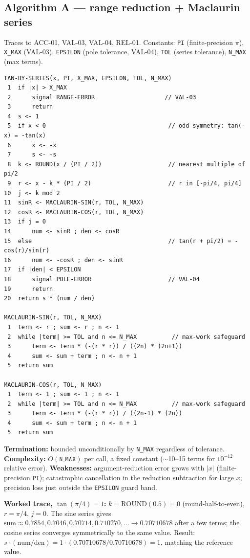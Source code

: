 \documentclass[11pt]{article}
\begin{document}
\subsection{Algorithm A --- range reduction + Maclaurin series}

Traces to ACC-01, VAL-03, VAL-04, REL-01. Constants: \texttt{PI} (finite-precision $\pi$), \texttt{X\_MAX} (VAL-03), \texttt{EPSILON} (pole tolerance, VAL-04), \texttt{TOL} (series tolerance), \texttt{N\_MAX} (max terms).

\begin{lstlisting}[style=pseudo,caption={Algorithm A: TAN-BY-SERIES},label={lst:algoA}]
TAN-BY-SERIES(x, PI, X_MAX, EPSILON, TOL, N_MAX)
 1  if |x| > X_MAX
 2      signal RANGE-ERROR                    // VAL-03
 3      return
 4  s <- 1
 5  if x < 0                                   // odd symmetry: tan(-x) = -tan(x)
 6      x <- -x
 7      s <- -s
 8  k <- ROUND(x / (PI / 2))                   // nearest multiple of pi/2
 9  r <- x - k * (PI / 2)                      // r in [-pi/4, pi/4]
10  j <- k mod 2
11  sinR <- MACLAURIN-SIN(r, TOL, N_MAX)
12  cosR <- MACLAURIN-COS(r, TOL, N_MAX)
13  if j = 0
14      num <- sinR ; den <- cosR
15  else                                       // tan(r + pi/2) = -cos(r)/sin(r)
16      num <- -cosR ; den <- sinR
17  if |den| < EPSILON
18      signal POLE-ERROR                      // VAL-04
19      return
20  return s * (num / den)

MACLAURIN-SIN(r, TOL, N_MAX)
 1  term <- r ; sum <- r ; n <- 1
 2  while |term| >= TOL and n <= N_MAX          // max-work safeguard
 3      term <- term * (-(r * r)) / ((2n) * (2n+1))
 4      sum <- sum + term ; n <- n + 1
 5  return sum

MACLAURIN-COS(r, TOL, N_MAX)
 1  term <- 1 ; sum <- 1 ; n <- 1
 2  while |term| >= TOL and n <= N_MAX          // max-work safeguard
 3      term <- term * (-(r * r)) / ((2n-1) * (2n))
 4      sum <- sum + term ; n <- n + 1
 5  return sum
\end{lstlisting}

\textbf{Termination:} bounded unconditionally by \texttt{N\_MAX} regardless of tolerance. \textbf{Complexity:} $O(\texttt{N\_MAX})$ per call, a fixed constant ($\sim$10--15 terms for $10^{-12}$ relative error). \textbf{Weaknesses:} argument-reduction error grows with $|x|$ (finite-precision \texttt{PI}); catastrophic cancellation in the reduction subtraction for large $x$; precision loss just outside the \texttt{EPSILON} guard band.

\textbf{Worked trace, $\tan(\pi/4)=1$:} $k=\mathrm{ROUND}(0.5)=0$ (round-half-to-even), $r=\pi/4$, $j=0$. The sine series gives $\mathrm{sum} \approx 0.7854, 0.7046, 0.70714, 0.710270, \ldots \to 0.70710678$ after a few terms; the cosine series converges symmetrically to the same value. Result: $s \cdot (\mathrm{num}/\mathrm{den}) = 1 \cdot (0.70710678/0.70710678) = 1$, matching the reference value.
\end{document}
